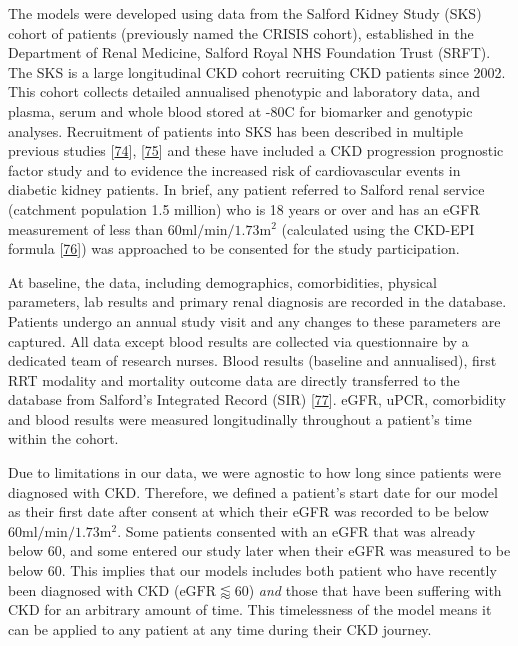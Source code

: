\documentclass[12pt,PhD,twoside,openright]{muthesis}
\begin{document}
The models were developed using data from the Salford Kidney Study (SKS) cohort of patients (previously named the CRISIS cohort), established in the Department of Renal Medicine, Salford Royal NHS Foundation Trust (SRFT). The SKS is a large longitudinal CKD cohort recruiting CKD patients since 2002. This cohort collects detailed annualised phenotypic and laboratory data, and plasma, serum and whole blood stored at -80\textdegree C for biomarker and genotypic analyses. Recruitment of patients into SKS has been described in multiple previous studies {[}\protect\hyperlink{ref-hoefield_factors_2010}{74}{]}, {[}\protect\hyperlink{ref-chinnadurai_increased_2019-1}{75}{]} and these have included a CKD progression prognostic factor study and to evidence the increased risk of cardiovascular events in diabetic kidney patients. In brief, any patient referred to Salford renal service (catchment population 1.5 million) who is 18 years or over and has an eGFR measurement of less than \(60\textrm{ml}/\textrm{min}/1.73\textrm{m}^2\) (calculated using the CKD-EPI formula {[}\protect\hyperlink{ref-levey_new_2009}{76}{]}) was approached to be consented for the study participation.

At baseline, the data, including demographics, comorbidities, physical parameters, lab results and primary renal diagnosis are recorded in the database. Patients undergo an annual study visit and any changes to these parameters are captured. All data except blood results are collected via questionnaire by a dedicated team of research nurses. Blood results (baseline and annualised), first RRT modality and mortality outcome data are directly transferred to the database from Salford's Integrated Record (SIR) {[}\protect\hyperlink{ref-new_obtaining_2014}{77}{]}. eGFR, uPCR, comorbidity and blood results were measured longitudinally throughout a patient's time within the cohort.

Due to limitations in our data, we were agnostic to how long since patients were diagnosed with CKD. Therefore, we defined a patient's start date for our model as their first date after consent at which their eGFR was recorded to be below \(60\textrm{ml}/\textrm{min}/1.73\textrm{m}^2\). Some patients consented with an eGFR that was already below 60, and some entered our study later when their eGFR was measured to be below 60. This implies that our models includes both patient who have recently been diagnosed with CKD (\(\textrm{eGFR} \lessapprox 60\)) \emph{and} those that have been suffering with CKD for an arbitrary amount of time. This timelessness of the model means it can be applied to any patient at any time during their CKD journey.
\end{document}
